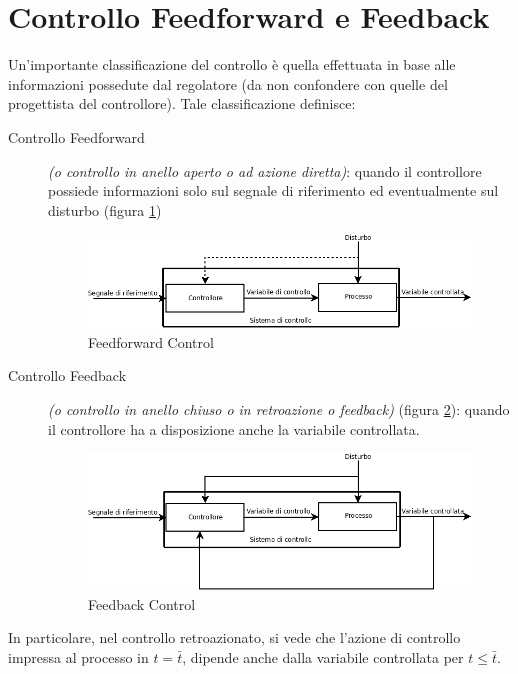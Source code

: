 \documentclass[a4paper]{report}
\begin{document}
\section{Controllo Feedforward e Feedback}
Un'importante classificazione del controllo \`e quella effettuata in base alle informazioni possedute dal regolatore (da non confondere con quelle del progettista del controllore). Tale classificazione definisce:
\begin{description}
\item[Controllo Feedforward]{\emph{(o controllo in anello aperto o ad
    azione diretta)}}: quando il controllore possiede informazioni
  solo sul segnale di riferimento ed eventualmente sul disturbo
  (figura \ref{fig:fig1})
\begin{figure}[!h]
  \begin{center}
    \includegraphics[scale=0.5]{./figures/feedforward.png}
    \caption{Feedforward Control}
    \label{fig:fig1}
  \end{center}
\end{figure}
\item[Controllo Feedback]{\emph{(o controllo in anello chiuso o in
    retroazione o feedback)}} (figura \ref{fig:fig2}): quando il
  controllore ha a disposizione anche la variabile controllata. 
\begin{figure}[!h]
  \begin{center}
    \includegraphics[scale=0.5]{./figures/feedback.png}\caption{Feedback Control}\label{fig:fig2}
  \end{center}
\end{figure}  
\end{description}
In particolare, nel controllo retroazionato, si vede che l'azione di
controllo impressa al processo in $t = \bar t$, dipende anche dalla
variabile controllata per $ t \leq \bar t$.
\end{document}
